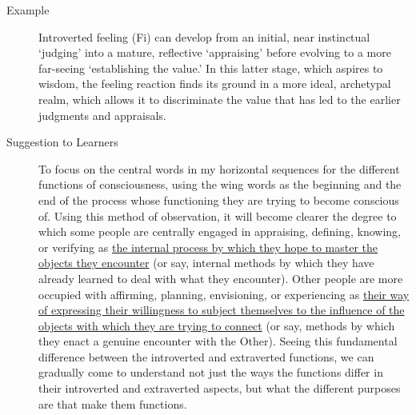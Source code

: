 \begin{table}[h!]
{\begin{description}
        \item[Example] Introverted feeling (Fi) can develop from an initial, near instinctual ‘judging’ into a mature, reflective ‘appraising’ before evolving to a more far-seeing ‘establishing the value.’ In this latter stage, which aspires to wisdom, the feeling reaction finds its ground in a more ideal, archetypal realm, which allows it to discriminate the value that has led to the earlier judgments and appraisals.

        \item[Suggestion to Learners]
            To focus on the central words in my horizontal sequences for the different functions of consciousness, using the wing words as the beginning and the end of the process whose functioning they are trying to become conscious of.
            Using this method of observation, it will become clearer the degree to which some people are centrally engaged in appraising, defining, knowing, or verifying as \ul{the internal process by which they hope to master the objects they encounter} (or say, internal methods by which they have already learned to deal with what they encounter).
            Other people are more occupied with affirming, planning, envisioning, or experiencing as \ul{their way of expressing their willingness to subject themselves to the influence of the objects with which they are trying to connect} (or say, methods by which they enact a genuine encounter with the Other).
            Seeing this fundamental difference between the introverted and extraverted functions, we can gradually come to understand not just the ways the functions differ in their introverted and extraverted aspects, but what the different purposes are that make them functions.

    \end{description}
    }



\end{table}
